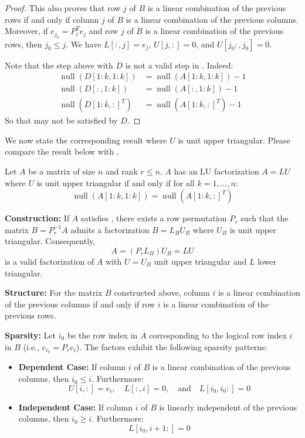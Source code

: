 \documentclass[10pt,twoside]{siamart1116}
\DeclareMathOperator{\nl}{null}
\numberwithin{theorem}{section}
\begin{document}
\begin{proof}
	This also proves that row $j$ of $B$ is a linear combination of the previous rows if and only if column $j$ of $B$ is a linear combination of the previous columns. Moreover, if $e_{j_0} = P_c^T e_j$ and row $j$ of $B$ is a linear combination of the previous rows, then $j_0 \le j$. We have $L[:,j] = e_j$, $U[j,:] = 0$, and $U[j_0:,j_0] = 0$.

	Note that the step above with $D$ is not a valid step in . Indeed:
	\begin{align*}
		\nl(D[1:k,1:k])   & = \nl(A[1:k,1:k]) - 1 \\
		\nl(D[:,1:k])     & = \nl(A[:,1:k]) - 1 \\
		\nl({D[1:k,:]}^T) & = \nl({A[1:k,:]}^T) - 1
	\end{align*}
	So that  may not be satisfied by $D$.
\end{proof}

We now state the corresponding result where $U$ is unit upper triangular. Please compare the result below with .

\begin{corollary}\label{corr:main_unit_upper}
	Let $A$ be a matrix of size $n$ and rank $r \le n$. $A$ has an LU factorization $A = LU$ where $U$ is unit upper triangular if and only if for all $k = 1, \ldots, n$:
	\begin{equation}
		\label{eq:cond_unit_upper}
		\nl(A[1:k,1:k]) = \nl({A[1:k,:]}^T)
	\end{equation}

	\noindent\textbf{Construction:} If $A$ satisfies , there exists a row permutation $P_r$ such that the matrix $B = P_r^{-1} A$ admits a factorization $B = L_B U_B$ where $U_B$ is unit upper triangular. Consequently,
	\[ A = (P_r L_B) U_B = L U \]
	is a valid factorization of $A$ with $U=U_B$ unit upper triangular and $L$ lower triangular.

	\noindent\textbf{Structure:} For the matrix $B$ constructed above, column $i$ is a linear combination of the previous columns if and only if row $i$ is a linear combination of the previous rows.

	\noindent\textbf{Sparsity:} Let $i_0$ be the row index in $A$ corresponding to the logical row index $i$ in $B$ (i.e., $e_{i_0} = P_r e_i$). The factors exhibit the following sparsity patterns:
	\begin{itemize}
		\item \textbf{Dependent Case:} If column $i$ of $B$ is a linear combination of the previous columns, then $i_0 \le i$. Furthermore:
		\[ U[i,:] = e_i, \quad L[:,i] = 0, \quad \text{and} \quad L[i_0, i_0:] = 0 \]
		\item \textbf{Independent Case:} If column $i$ of $B$ is linearly independent of the previous columns, then $i_0 \ge i$. Furthermore:
		\[ L[i_0, i+1:] = 0 \]
	\end{itemize}
\end{corollary}
\end{document}
